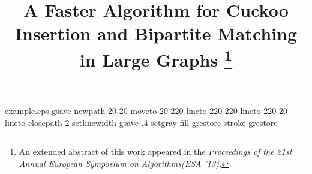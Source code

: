 %
%
%
%
%
\begin{filecontents*}{example.eps}
gsave
newpath
  20 20 moveto
  20 220 lineto
  220 220 lineto
  220 20 lineto
closepath
2 setlinewidth
gsave
  .4 setgray fill
grestore
stroke
grestore
\end{filecontents*}
%
\RequirePackage{fix-cm}
%

\documentclass[11pt]{article}        %
%
\smartqed  %
%
\usepackage{graphicx}
%
%
%
%
%


\usepackage{color}
\usepackage{amsfonts,amsmath,algorithm,graphicx,subfigure}
\usepackage{booktabs} 
\usepackage[noend]{algorithmic}

\newcommand{\la}{\ell}





\title{A Faster Algorithm for Cuckoo Insertion and Bipartite Matching in Large Graphs \footnote{An extended abstract of this work appeared in the \emph{Proceedings of the 21st Annual European Symposium on Algorithms(ESA '13)\cite{inc:khosla13}.}}%
}

